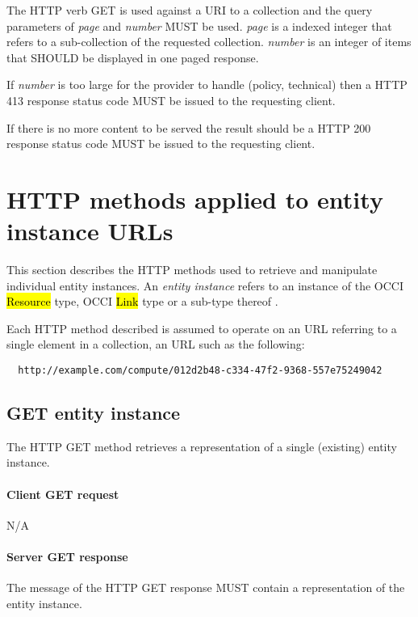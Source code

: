 \documentclass[10pt,a4paper]{article}
\begin{document}
The HTTP verb GET is used against a URI to a collection and the query parameters of {\em page} and {\em number} MUST be used. {\em page} is a indexed 
integer that refers to a sub-collection of the requested collection. {\em number} is an integer of items that SHOULD be displayed in one paged response.


If {\em number} is too large for the provider to handle (policy, technical) then a HTTP 413 response status code MUST be issued to the requesting client.

If there is no more content to be served the result should be a HTTP 200 response status code MUST be issued to the requesting client.


\section{HTTP methods applied to entity instance URLs}


This section describes the HTTP methods used to retrieve and manipulate
individual entity instances. An {\em entity instance} refers to an instance
of the OCCI \hl{Resource} type, OCCI \hl{Link} type or a sub-type thereof
\cite{occi:core}.

Each HTTP method described is assumed to operate
on an URL referring to a single element in a collection, an URL such as the
following:
\begin{verbatim}
  http://example.com/compute/012d2b48-c334-47f2-9368-557e75249042
\end{verbatim}

\subsection{GET entity instance}
The HTTP GET method retrieves a representation of a single (existing) entity instance.

\paragraph{Client GET request}
N/A

\paragraph{Server GET response}
The message of the HTTP GET response MUST contain a representation of the entity instance.
\end{document}
